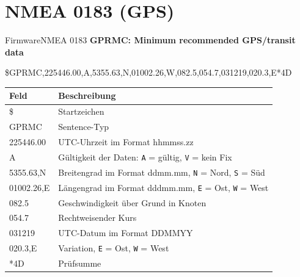 \documentclass{beamer}
\begin{document}
\section{NMEA 0183 (GPS)}
\begin{frame}{Firmware}{NMEA 0183}
    \textbf{GPRMC: Minimum recommended GPS/transit data}

    \begin{scriptsize}
    \begin{center}
        \$GPRMC,225446.00,A,5355.63,N,01002.26,W,082.5,054.7,031219,020.3,E*4D
    \end{center}
    \begin{table}[H]
        \centering
        \begin{tabular}{|l|l|}
            \hline
            \textbf{Feld}   & \textbf{Beschreibung}\\
            \hline
            \$              & Startzeichen\\
            GPRMC           & Sentence-Typ\\
            225446.00       & UTC-Uhrzeit im Format hhmmss.zz\\
            A               & Gültigkeit der Daten: \texttt{A} = gültig, \texttt{V} = kein Fix\\
            5355.63,N       & Breitengrad im Format ddmm.mm, \texttt{N} = Nord, \texttt{S} = Süd\\
            01002.26,E      & Längengrad im Format dddmm.mm, \texttt{E} = Ost, \texttt{W} = West\\
            082.5           & Geschwindigkeit über Grund in Knoten\\
            054.7           & Rechtweisender Kurs\\
            031219          & UTC-Datum im Format DDMMYY\\
            020.3,E         & Variation, \texttt{E} = Ost, \texttt{W} = West\\
            *4D             & Prüfsumme\\
            \hline
        \end{tabular}
    \end{table}
    \end{scriptsize}
\end{frame}
\end{document}
